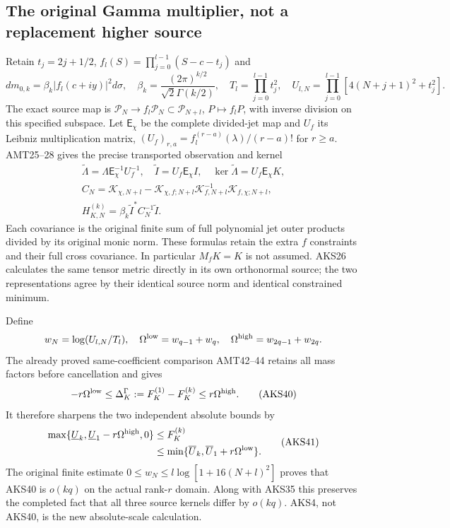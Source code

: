 \documentclass[11pt,a4paper]{article}
\begin{document}
\subsection{The original Gamma multiplier, not a replacement higher source}
Retain $t_j=2j+1/2$, $f_l(S)=\prod_{j=0}^{l-1}(S-c-t_j)$ and
\[
 dm_{0,k}=\beta_k|f_l(c+iy)|^2d\sigma,\quad
 \beta_k=\frac{(2\pi)^{k/2}}{\sqrt2\Gamma(k/2)},\quad
 T_l=\prod_{j=0}^{l-1}t_j^2,\quad
 U_{l,N}=\prod_{j=0}^{l-1}[4(N+j+1)^2+t_j^2].
 \tag{AKS38}
\]
The exact source map is $\mathcal P_N\to f_l\mathcal P_N\subset
\mathcal P_{N+l}$, $P\mapsto f_lP$, with inverse division on this
specified subspace. Let $\mathsf E_\chi$ be the complete divided-jet
map and $U_f$ its Leibniz multiplication matrix,
$(U_f)_{r,a}=f_l^{(r-a)}(\lambda)/(r-a)!$ for $r\ge a$.
AMT25--28 gives the precise transported observation and kernel
\[
\begin{gathered}
 \widetilde\Lambda=\Lambda\mathsf E_\chi^{-1}U_f^{-1},\quad
 \widetilde I=U_f\mathsf E_\chi I,\quad
 \ker\widetilde\Lambda=U_f\mathsf E_\chi K,\\
 C_N=\mathscr K_{\chi,N+l}
   -\mathscr K_{\chi,f;N+l}\mathscr K_{f,N+l}^{-1}
                               \mathscr K_{f,\chi;N+l},\\
 H_{K,N}^{(k)}=\beta_k\widetilde I^*C_N^{-1}\widetilde I.
\end{gathered}\tag{AKS39}
\]
Each covariance is the original finite sum of full polynomial jet outer
products divided by its original monic norm. These formulas retain the
extra $f$ constraints and their full cross covariance. In particular
$M_fK=K$ is not assumed. AKS26 calculates the same tensor metric directly
in its own orthonormal source; the two representations agree by their
identical source norm and identical constrained minimum.

Define
\[
 w_N=\log(U_{l,N}/T_l),\quad
 \Omega^{\rm low}=w_{q-1}+w_q,\quad
 \Omega^{\rm high}=w_{2q-1}+w_{2q}.
\]
The already proved same-coefficient comparison AMT42--44 retains all
mass factors before cancellation and gives
\[
 -r\Omega^{\rm low}\le\Delta_K^\Gamma:=F_K^{(1)}-F_K^{(k)}
                         \le r\Omega^{\rm high}.
 \tag{AKS40}
\]
It therefore sharpens the two independent absolute bounds by
\[
\begin{split}
 \max\{\underline U_k,\underline U_1-r\Omega^{\rm high},0\}
       &\le F_K^{(k)}\\
       &\le\min\{\overline U_k,\overline U_1+r\Omega^{\rm low}\}.
\end{split}\tag{AKS41}
\]
The original finite estimate
$0\le w_N\le l\log[1+16(N+l)^2]$ proves that AKS40 is $o(kq)$ on the
actual rank-$r$ domain. Along with AKS35 this preserves the completed
fact that all three source kernels differ by $o(kq)$. AKS4, not AKS40,
is the new absolute-scale calculation.
\end{document}
